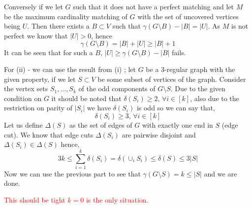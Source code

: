 \documentclass{article}
\numberwithin{equation}{section}
\newcommand{\card}[1]{\left|#1\right|}
\begin{document}
Conversely if we let $G$ such that it does not have a perfect matching and let $M$ be the maximum cardinality matching of $G$ with the set of uncovered vertices being $U$. Then there exists a $B\subset V$ such that $\gamma(G\setminus B) - \card{B} = \card{U}$. As $M$ is not perfect we know that $\card{U} > 0$, hence 
\begin{equation}
    \label{e3}
    \gamma(G\setminus B) = \card{B} + \card{U} \ge \card{B} + 1
\end{equation}
It can be seen that for such a $B$, $\card{U} \ge \gamma(G\setminus B) - \card{B}$ fails. 

For (ii) - we can use the result from (i) ; let $G$ be a 3-regular graph with the given property, if we let $S\subset V$ be some subset of vertices of the graph. Consider the vertex sets $S_1, \dots, S_k$ of the odd components of $G\setminus S$. Due to the given condition on $G$ it should be noted that $\delta(S_i) \ge 2, \, \forall i\in[k]$, also due to the restriction on parity of $\card{S_i}$ we have $\delta(S_i)$ is odd so we can say that, 
\begin{equation}
    \delta(S_i) \ge 3, \, \forall i\in[k]
\end{equation}
Let us define $\Delta(S)$ as the set of edges of $G$ with exactly one end in $S$ (edge cut). We know that edge cuts $\Delta(S_i)$ are pairwise disjoint and $\Delta(S_i) \in \Delta(S)$ hence, 
\begin{equation}
    3k \le \sum_{i=1}^{k} \delta(S_i) = \delta(\cup_i S_i) \le \delta(S) \le 3 \card{S}
\end{equation}
Now we can use the previous part to see that $\gamma(G\setminus S) = k \le \card{S}$ and we are done. 

\textcolor{red}{This should be tight $k = 0$ is the only situation.}
\end{document}
